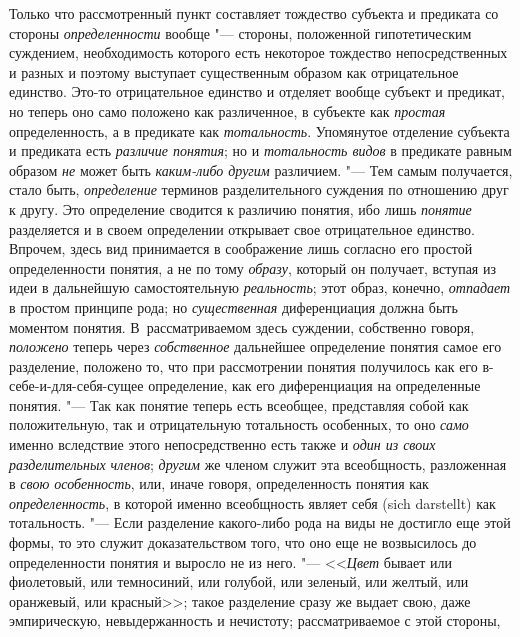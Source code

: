 Только что рассмотренный пункт составляет тождество субъекта и
предиката со стороны {\em определенности}
вообще "--- стороны, положенной гипотетическим
суждением, необходимость которого есть некоторое тождество непосредственных
и разных и поэтому выступает существенным образом как отрицательное
единство. Это-то отрицательное единство и отделяет вообще субъект и
предикат, но теперь оно само положено как различенное, в субъекте как
{\em простая} определенность, а в предикате как {\em тотальность}.
Упомянутое отделение субъекта и предиката есть {\em различие понятия};
но и {\em тотальность видов} в предикате равным образом {\em не} может быть
{\em каким-либо другим} различием. "--- Тем самым получается, стало быть,
{\em определение} терминов разделительного суждения по отношению друг к другу.
Это определение сводится к различию понятия, ибо лишь {\em понятие} разделяется
и в своем определении открывает свое отрицательное единство. Впрочем, здесь
вид принимается в соображение лишь согласно его простой определенности
понятия, а не по тому {\em образу}, который он получает, вступая из идеи
в дальнейшую самостоятельную {\em реальность}; этот образ, конечно,
{\em отпадает} в простом принципе рода; но {\em существенная}
диференциация должна быть моментом понятия. В~рассматриваемом здесь
суждении, собственно говоря, {\em положено} теперь через {\em собственное}
дальнейшее определение понятия самое его разделение, положено
то, что при рассмотрении понятия получилось как его в-себе-и-для-себя-сущее
определение, как его диференциация на определенные понятия. "---
Так как понятие теперь есть всеобщее, представляя собой как
положительную, так и отрицательную тотальность особенных, то оно
{\em само} именно вследствие этого непосредственно есть также и
{\em один из своих разделительных членов}; {\em другим} же
членом служит эта всеобщность, разложенная в {\em свою особенность},
или, иначе говоря, определенность понятия как {\em определенность}, в
которой именно всеобщность являет себя (sich darstellt) как
тотальность. "--- Если разделение какого-либо рода на виды не
достигло еще этой формы, то это служит доказательством того, что оно еще не
возвысилось до определенности понятия и выросло не из него. "---
<<{\em Цвет} бывает или фиолетовый, или темносиний, или голубой, или
зеленый, или желтый, или оранжевый, или красный>>;
такое разделение сразу же выдает свою, даже
эмпирическую, невыдержанность и нечистоту; рассматриваемое с этой стороны,
